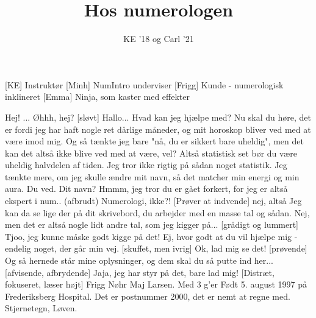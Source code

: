 \documentclass[a4paper,11pt]{article}
\title{Hos numerologen}
\author{KE '18 og Carl '21}
\begin{document}
\maketitle

\begin{roles}
[KE] Instruktør
[Minh] NumIntro underviser
[Frigg] Kunde - numerologisk inklineret
[Emma] Ninja, som kaster med effekter
\end{roles}

\begin{sketch}
 Hej!
 ...
 Øhhh, hej?
[sløvt] Hallo... Hvad kan jeg hjælpe med? 
 Nu skal du høre, det er fordi jeg har haft nogle ret dårlige måneder, og mit horoskop bliver ved med at være imod mig. Og så tænkte jeg bare "nå, du er sikkert bare uheldig", men det kan det altså ikke blive ved med at være, vel?
 Altså statistisk set bør du være uheldig halvdelen af tiden.
 Jeg tror ikke rigtig på sådan noget statistik. Jeg tænkte mere, om jeg skulle ændre mit navn, så det matcher min energi og min aura. Du ved.
 Dit navn? Hmmm, jeg tror du er gået forkert, for jeg er altså ekspert i num.. (afbrudt)
 Numerologi, ikke?!
[Prøver at indvende] nej, altså
 Jeg kan da se lige der på dit skrivebord, du arbejder med en masse tal og sådan.
 Nej, men det er altså nogle lidt andre tal, som jeg kigger på... 
[grådigt og lummert] Tjoo, jeg kunne måske godt kigge på det!
 Ej, hvor godt at du vil hjælpe mig - endelig noget, der går min vej.
[skuffet, men ivrig] Ok, lad mig se det!
[prøvende] Og så hernede står mine oplysninger, og dem skal du så putte ind her...
[afvisende, afbrydende] Jaja, jeg har styr på det, bare lad mig! 
[Distræt, fokuseret, læser højt] Frigg Nøhr Maj Larsen. 
 Med 3 g'er 
 Født 5. august 1997 på Frederiksberg Hospital. Det er postnummer 2000, det er nemt at regne med. Stjernetegn, Løven. 

\end{sketch}
\end{document}
